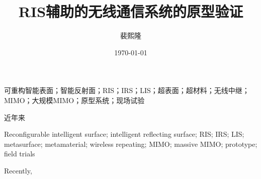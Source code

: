 \documentclass[supercite]{HustGraduPaper}
\title{RIS辅助的无线通信系统的原型验证} %
\author{裴熙隆} %
\date{\today} %
\begin{document}
	\maketitle
	
	\statement[confidentiality = false]
	
	\clearpage %
	
	\begin{cnabstract}{可重构智能表面；智能反射面；RIS；IRS；LIS；超表面；超材料；无线中继；MIMO；大规模MIMO；原型系统；现场试验}
		
		近年来
		
	\end{cnabstract}
	\begin{enabstract}{Reconfigurable intelligent surface; intelligent reflecting surface; RIS; IRS; LIS; metasurface; metamaterial; wireless repeating; MIMO; massive MIMO; prototype; field trials}

		Recently, 

	\end{enabstract}
	
	\tableofcontents
	
\end{document}
